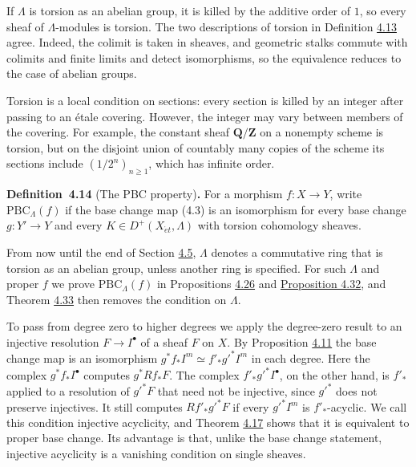 \documentclass[11pt]{article}
\newenvironment{bpstatement}[2]{\par\addvspace{0.6\baselineskip}\noindent\textbf{#1}#2\textbf{.}\enspace\ignorespaces}
  {\par\addvspace{0.4\baselineskip}}
\begin{document}
\label{bp321}%
If \(\Lambda\) is torsion as an abelian group, it is killed by the additive order of \(1\), so every sheaf of \(\Lambda\)-modules is torsion. The two descriptions of torsion in Definition \hyperref[bp320]{4.13} agree. Indeed, the colimit is taken in sheaves, and geometric stalks commute with colimits and finite limits and detect isomorphisms, so the equivalence reduces to the case of abelian groups.

Torsion is a local condition on sections: every section is killed by an integer after passing to an étale covering. However, the integer may vary between members of the covering. For example, the constant sheaf \(\mathbf Q/\mathbf Z\) on a nonempty scheme is torsion, but on the disjoint union of countably many copies of the scheme its sections include \((1/2^n)_{n\geq1}\), which has infinite order.

\label{bp322}%
\begin{bpstatement}{Definition~4.14}{ (The PBC property)}
For a morphism \(f:X\to Y\), write \(\mathrm{PBC}_{\Lambda}(f)\) if the base change map (4.3) is an isomorphism for every base change \(g:Y'\to Y\) and every \(K\in D^+(X_{\acute{e}t},\Lambda)\) with torsion cohomology sheaves.
\end{bpstatement}

\label{bp323}%
From now until the end of Section \hyperref[bp362]{4.5}, \(\Lambda\) denotes a commutative ring that is torsion as an abelian group, unless another ring is specified. For such \(\Lambda\) and proper \(f\) we prove \(\mathrm{PBC}_\Lambda(f)\) in Propositions \hyperref[bp360]{4.26} and \hyperref[bp378]{Proposition 4.32}, and Theorem \hyperref[bp382]{4.33} then removes the condition on \(\Lambda\).

To pass from degree zero to higher degrees we apply the degree-zero result to an injective resolution \(F\to I^\bullet\) of a sheaf \(F\) on \(X\). By Proposition \hyperref[bp314]{4.11} the base change map is an isomorphism \(g^*f_*I^m\simeq f'_*g'^*I^m\) in each degree. Here the complex \(g^*f_*I^\bullet\) computes \(g^*Rf_*F\). The complex \(f'_*g'^*I^\bullet\), on the other hand, is \(f'_*\) applied to a resolution of \(g'^*F\) that need not be injective, since \(g'^*\) does not preserve injectives. It still computes \(Rf'_*g'^*F\) if every \(g'^*I^m\) is \(f'_*\)-acyclic. We call this condition injective acyclicity, and Theorem \hyperref[bp329]{4.17} shows that it is equivalent to proper base change. Its advantage is that, unlike the base change statement, injective acyclicity is a vanishing condition on single sheaves.
\end{document}
